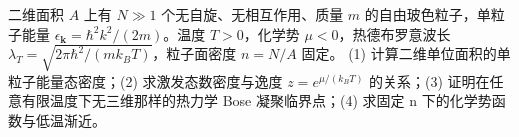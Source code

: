 二维面积 \(A\) 上有 \(N\gg1\) 个无自旋、无相互作用、质量 \(m\) 的自由玻色粒子，单粒子能量 \(\epsilon_{\boldsymbol k}=\hbar^2k^2/(2m)\)。温度 \(T>0\)，化学势 \(\mu<0\)，热德布罗意波长 \(\lambda_T=\sqrt{2\pi\hbar^2/(mk_BT)}\)，粒子面密度 \(n=N/A\) 固定。
(1) 计算二维单位面积的单粒子能量态密度；(2) 求激发态数密度与逸度 \(z=e^{\mu/(k_BT)}\) 的关系；(3) 证明在任意有限温度下无三维那样的热力学 Bose 凝聚临界点；(4) 求固定 n 下的化学势函数与低温渐近。
